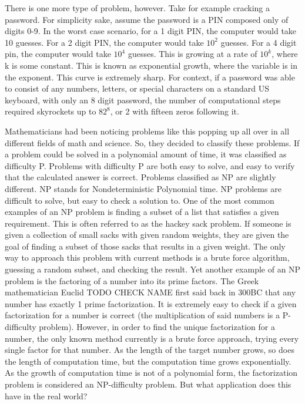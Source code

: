 \documentclass[12pt]{article}
\begin{document}
\begin{flushleft}
 There is one more type of problem, however. Take for example cracking a password. For simplicity sake, assume the password is a PIN composed only of digits 0-9. In the worst case scenario, for a 1 digit PIN, the computer would take 10 guesses. For a 2 digit PIN, the computer would take $10^2$ guesses. For a 4 digit pin, the computer would take $10^4$ guesses. This is growing at a rate of $10^k$, where k is some constant. This is known as exponential growth, where the variable is in the exponent. This curve is extremely sharp. For context, if a password was able to consist of any numbers, letters, or special characters on a standard US keyboard, with only an 8 digit password, the number of computational steps required skyrockets up to $82^8$, or 2 with fifteen zeros following it. 


Mathematicians had been noticing problems like this popping up all over in all different fields of math and science. So, they decided to classify these problems. If a problem could be solved in a polynomial amount of time, it was classified as difficulty P. Problems with difficulty P are both easy to solve, and easy to verify that the calculated answer is correct. 
Problems classified as NP are slightly different. NP stands for Nondeterministic Polynomial time. NP problems are difficult to solve, but easy to check a solution to. One of the most common examples of an NP problem is finding a subset of a list that satisfies a given requirement. This is often referred to as the hackey sack problem. If someone is given a collection of small sacks with given random weights, they are given the goal of finding a subset of those sacks that results in a given weight. The only way to approach this problem with current methods is a brute force algorithm, guessing a random subset, and checking the result. Yet another example of an NP problem is the factoring of a number into its prime factors. The Greek mathematician Euclid TODO CHECK NAME first said back in 300BC that any number has exactly 1 prime factorization. It is extremely easy to check if a given factorization for a number is correct (the multiplication of said numbers is a P-difficulty problem). However, in order to find the unique factorization for a number, the only known method currently is a brute force approach, trying every single factor for that number. As the length of the target number grows, so does the length of computation time, but the computation time grows exponentially. As the growth of computation time is not of a polynomial form, the factorization problem is considered an NP-difficulty problem. But what application does this have in the real world?



\end{flushleft}
\end{document}

